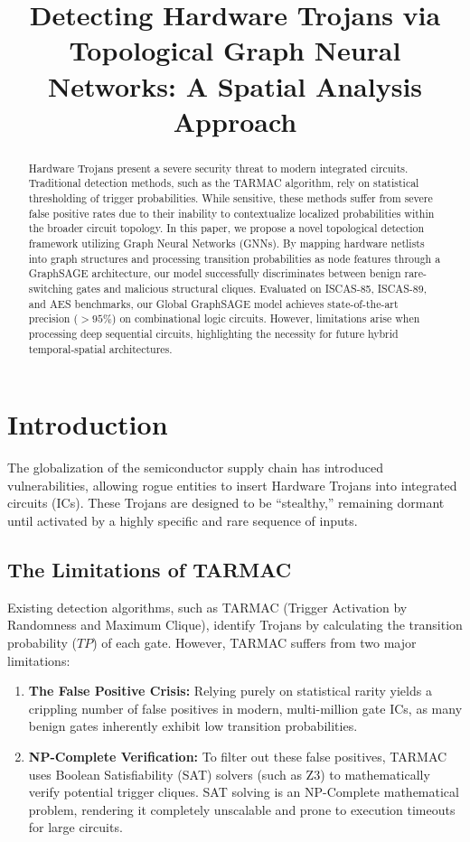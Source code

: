 \documentclass[conference]{IEEEtran}
\begin{document}
\title{Detecting Hardware Trojans via Topological Graph Neural Networks: A Spatial Analysis Approach}


\maketitle

\begin{abstract}
Hardware Trojans present a severe security threat to modern integrated circuits. Traditional detection methods, such as the TARMAC algorithm, rely on statistical thresholding of trigger probabilities. While sensitive, these methods suffer from severe false positive rates due to their inability to contextualize localized probabilities within the broader circuit topology. In this paper, we propose a novel topological detection framework utilizing Graph Neural Networks (GNNs). By mapping hardware netlists into graph structures and processing transition probabilities as node features through a GraphSAGE architecture, our model successfully discriminates between benign rare-switching gates and malicious structural cliques. Evaluated on ISCAS-85, ISCAS-89, and AES benchmarks, our Global GraphSAGE model achieves state-of-the-art precision ($>95\%$) on combinational logic circuits. However, limitations arise when processing deep sequential circuits, highlighting the necessity for future hybrid temporal-spatial architectures.
\end{abstract}

\section{Introduction}
The globalization of the semiconductor supply chain has introduced vulnerabilities, allowing rogue entities to insert Hardware Trojans into integrated circuits (ICs). These Trojans are designed to be ``stealthy,'' remaining dormant until activated by a highly specific and rare sequence of inputs. 

\subsection{The Limitations of TARMAC}
Existing detection algorithms, such as TARMAC (Trigger Activation by Randomness and Maximum Clique), identify Trojans by calculating the transition probability ($TP$) of each gate. However, TARMAC suffers from two major limitations:
\begin{enumerate}
    \item \textbf{The False Positive Crisis:} Relying purely on statistical rarity yields a crippling number of false positives in modern, multi-million gate ICs, as many benign gates inherently exhibit low transition probabilities.
    \item \textbf{NP-Complete Verification:} To filter out these false positives, TARMAC uses Boolean Satisfiability (SAT) solvers (such as Z3) to mathematically verify potential trigger cliques. SAT solving is an NP-Complete mathematical problem, rendering it completely unscalable and prone to execution timeouts for large circuits.
\end{enumerate}
\end{document}
